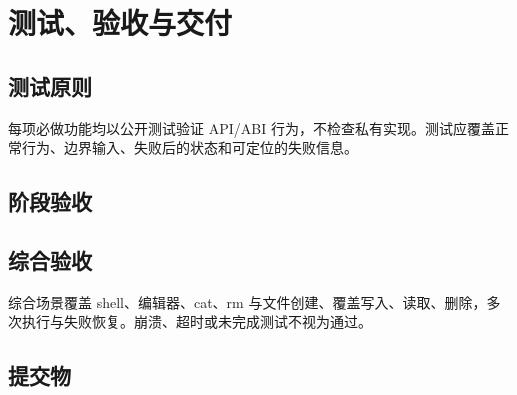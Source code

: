 \chapter{测试、验收与交付}

\section{测试原则}
每项必做功能均以公开测试验证 API/ABI 行为，不检查私有实现。测试应覆盖正常行为、边界输入、失败后的状态和可定位的失败信息。

\section{阶段验收}

\section{综合验收}
综合场景覆盖 shell、编辑器、cat、rm 与文件创建、覆盖写入、读取、删除，多次执行与失败恢复。崩溃、超时或未完成测试不视为通过。

\section{提交物}
